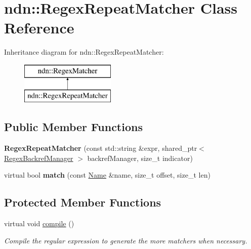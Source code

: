 \hypertarget{classndn_1_1RegexRepeatMatcher}{}\section{ndn\+:\+:Regex\+Repeat\+Matcher Class Reference}
\label{classndn_1_1RegexRepeatMatcher}
Inheritance diagram for ndn\+:\+:Regex\+Repeat\+Matcher\+:\begin{figure}[H]
\begin{center}
\leavevmode
\includegraphics[height=2.000000cm]{classndn_1_1RegexRepeatMatcher}
\end{center}
\end{figure}
\subsection*{Public Member Functions}
\begin{DoxyCompactItemize}
\item 
{\bfseries Regex\+Repeat\+Matcher} (const std\+::string \&expr, shared\+\_\+ptr$<$ \hyperlink{classndn_1_1RegexBackrefManager}{Regex\+Backref\+Manager} $>$ backref\+Manager, size\+\_\+t indicator)\hypertarget{classndn_1_1RegexRepeatMatcher_ac21d37758a561b546e0d7c8b684a7943}{}\label{classndn_1_1RegexRepeatMatcher_ac21d37758a561b546e0d7c8b684a7943}

\item 
virtual bool {\bfseries match} (const \hyperlink{classndn_1_1Name}{Name} \&name, size\+\_\+t offset, size\+\_\+t len)\hypertarget{classndn_1_1RegexRepeatMatcher_a94f56e176ff29975a2b743781e5385b0}{}\label{classndn_1_1RegexRepeatMatcher_a94f56e176ff29975a2b743781e5385b0}

\end{DoxyCompactItemize}
\subsection*{Protected Member Functions}
\begin{DoxyCompactItemize}
\item 
virtual void \hyperlink{classndn_1_1RegexRepeatMatcher_adc36f5cd289c19956ede1ab16763f218}{compile} ()
\begin{DoxyCompactList}\small\item\em Compile the regular expression to generate the more matchers when necessary. \end{DoxyCompactList}\end{DoxyCompactItemize}

